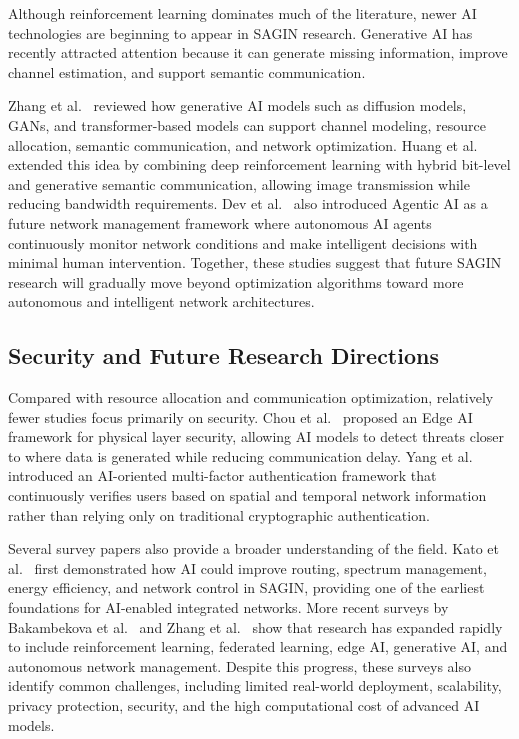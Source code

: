 \documentclass[letterpaper]{article} %
\begin{document}
Although reinforcement learning dominates much of the literature, newer AI technologies are beginning to appear in SAGIN research. Generative AI has recently attracted attention because it can generate missing information, improve channel estimation, and support semantic communication.

Zhang et al.~\citep{zhang2024generative} reviewed how generative AI models such as diffusion models, GANs, and transformer-based models can support channel modeling, resource allocation, semantic communication, and network optimization. Huang et al.~\citep{huang2024deep} extended this idea by combining deep reinforcement learning with hybrid bit-level and generative semantic communication, allowing image transmission while reducing bandwidth requirements. Dev et al.~\citep{dev2025advanced} also introduced Agentic AI as a future network management framework where autonomous AI agents continuously monitor network conditions and make intelligent decisions with minimal human intervention. Together, these studies suggest that future SAGIN research will gradually move beyond optimization algorithms toward more autonomous and intelligent network architectures.

\subsection{Security and Future Research Directions}

Compared with resource allocation and communication optimization, relatively fewer studies focus primarily on security. Chou et al.~\citep{chou2024edge} proposed an Edge AI framework for physical layer security, allowing AI models to detect threats closer to where data is generated while reducing communication delay. Yang et al.~\citep{byang2023atmas} introduced an AI-oriented multi-factor authentication framework that continuously verifies users based on spatial and temporal network information rather than relying only on traditional cryptographic authentication.

Several survey papers also provide a broader understanding of the field. Kato et al.~\citep{kato2019optimizing} first demonstrated how AI could improve routing, spectrum management, energy efficiency, and network control in SAGIN, providing one of the earliest foundations for AI-enabled integrated networks. More recent surveys by Bakambekova et al.~\citep{bakambekova2024interplay} and Zhang et al.~\citep{zhang2024management} show that research has expanded rapidly to include reinforcement learning, federated learning, edge AI, generative AI, and autonomous network management. Despite this progress, these surveys also identify common challenges, including limited real-world deployment, scalability, privacy protection, security, and the high computational cost of advanced AI models.
\end{document}
